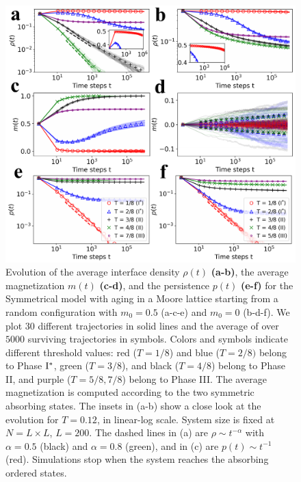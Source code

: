 \begin{figure}
        \centering \captionsetup{font=sf}
        \includegraphics[width=\linewidth]{Figs/Aging_STM/FIG12.pdf}
        \caption[Modified dynamical regimes by aging in a Moore lattice]{\label{fig:evolution_lattice_aging} Evolution of the average interface density $\rho(t)$ \textbf{(a-b)}, the average magnetization $m(t)$ \textbf{(c-d)}, and the persistence $p(t)$ \textbf{(e-f)} for the Symmetrical model with aging in a Moore lattice starting from a random configuration with $m_0 = 0.5$ (a-c-e) and $m_0 = 0$ (b-d-f). We plot 30 different trajectories in solid lines and the average of over $5000$ surviving trajectories in symbols. Colors and symbols indicate different threshold values: red ($T = 1/8$) and blue ($T = 2/8)$ belong to Phase ${\rm I}^{*}$, green ($T = 3/8$), and black ($T=4/8$) belong to Phase II, and purple ($T = 5/8, 7/8$) belong to Phase III. The average magnetization is computed according to the two symmetric absorbing states. The insets in (a-b) show a close look at the evolution for $T = 0.12$, in linear-log scale. System size is fixed at $N = L \times L$, $L = 200$. The dashed lines in (a) are $\rho \sim t^{-\alpha}$ with $\alpha = 0.5$ (black) and $\alpha = 0.8$ (green), and in (c) are $p(t) \sim t^{-1}$ (red). 
        Simulations stop when the system reaches the absorbing ordered states.}
\end{figure}

